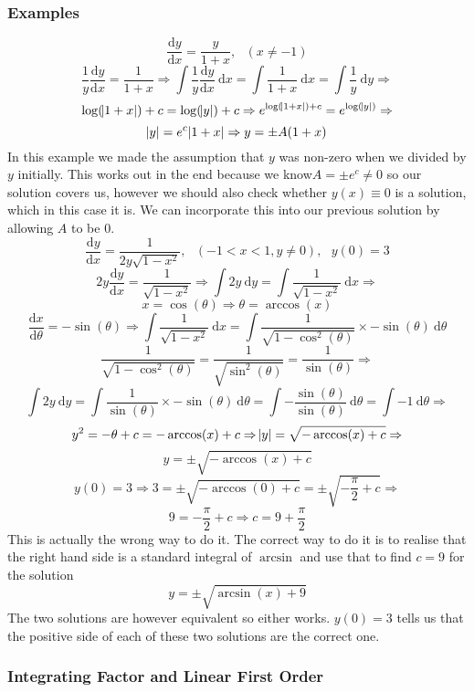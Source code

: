 \documentclass[12pt]{report}
\newcommand{\dx}{\:\mathrm{d}x}
\newcommand{\dy}{\:\mathrm{d}y}
\newcommand{\dd}[2]{\frac{\mathrm{d}#1}{\mathrm{d}#2}}
\newcommand{\mcom}{, \:\:\:}
\begin{document}
\begin{flushleft}
\subsubsection*{Examples}
\[\dd{y}{x} = \frac{y}{1 + x}\mcom(x\neq -1)\]
\[\frac{1}{y}\dd{y}{x} = \frac{1}{1 + x} \Rightarrow
\int\frac{1}{y}\dd{y}{x}\dx = \int\frac{1}{1 + x}\dx = \int\frac{1}{y}\dy
\Rightarrow\]
\[\log(\abs{1 + x}) + c = \log(\abs{y}) + c \Rightarrow 
e^{\log(\abs{1 + x}) + c} = e^{\log(\abs{y})} \Rightarrow\]
\[\abs{y} = e^c\abs{1 + x} \Rightarrow y = \pm A(1 + x)\]
In this example we made the assumption that \(y\) was non-zero when we divided
by \(y\) initially. This works out in the end because we know\(A=\pm e^c\neq0\)
so our solution covers us, however we should also check whether \(y(x)\equiv0\)
is a solution, which in this case it is. We can incorporate this into our
previous solution by allowing \(A\) to be \(0\).
\[\dd{y}{x} = \frac{1}{2y\sqrt{1 - x^2}}\mcom(-1 < x < 1,y\neq 0)\mcom y(0)=3\]
\[2y\dd{y}{x} = \frac{1}{\sqrt{1 - x^2}} \Rightarrow\int2y\dy 
= \int\frac{1}{\sqrt{1 - x^2}}\dx \Rightarrow\]
\[x = \cos(\theta) \Rightarrow \theta = \arccos(x)\]
\[\dd{x}{\theta} = -\sin(\theta) \Rightarrow \int\frac{1}{\sqrt{1 - x^2}}\dx
= \int\frac{1}{\sqrt{1-\cos^2(\theta)}}\times-\sin(\theta)\:\mathrm{d}\theta\]
\[\frac{1}{\sqrt{1 - \cos^2(\theta)}} = \frac{1}{\sqrt{\sin^2(\theta)}} 
= \frac{1}{\sin(\theta)} \Rightarrow\]
\[\int2y\dy = \int\frac{1}{\sin(\theta)}\times-\sin(\theta)\:\mathrm{d}\theta
= \int -\frac{\sin(\theta)}{\sin(\theta)}\:\mathrm{d}\theta 
= \int-1\:\mathrm{d}\theta \Rightarrow\]
\[y^2 = -\theta + c = -\arccos(x) + c \Rightarrow \abs{y} 
= \sqrt{-\arccos(x) + c} \Rightarrow\]
\[y = \pm\sqrt{-\arccos(x) + c}\]
\[y(0) = 3 \Rightarrow 3 = \pm\sqrt{-\arccos(0) + c} 
= \pm\sqrt{-\frac{\pi}{2} + c} \Rightarrow\]
\[9 = -\frac{\pi}{2} + c \Rightarrow c = 9 + \frac{\pi}{2}\]
This is actually the wrong way to do it. The correct way to do it is to realise
that the right hand side is a standard integral of \(\arcsin\) and use that to
find \(c = 9\) for the solution
\[y = \pm\sqrt{\arcsin(x) + 9}\]
The two solutions are however equivalent so either works. \(y(0) = 3\) tells
us that the positive side of each of these two solutions are the correct one.

\subsubsection*{Integrating Factor and Linear First Order}


\end{flushleft}
\end{document}
